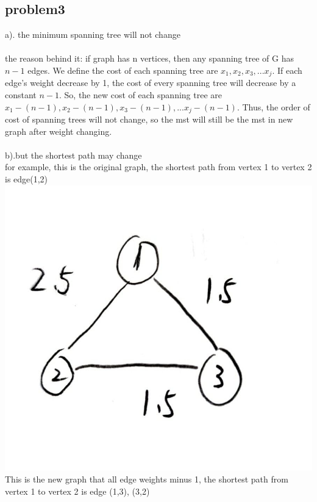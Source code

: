 \documentclass[11pt]{article}
\begin{document}
\subsection{problem3}
a). the minimum spanning tree will not change\\
\\the reason behind it: if graph has n vertices, then any spanning tree of G has $n-1$ edges. We define the cost of each spanning tree are $x_1,x_2,x_3,...x_j$. If each edge's weight decrease by 1, the cost of every spanning tree will decrease  by a constant $n-1$. So, the new cost of each spanning tree are $x_1-(n-1),x_2-(n-1),x_3-(n-1),...x_j-(n-1)$. Thus, the order of cost of spanning trees will not change, so the mst will still be the mst in new graph after weight changing.   \\
\\
b).but the shortest path may change\\
for example, this is the original graph, the shortest path from vertex 1 to vertex 2 is edge(1,2)\\
\includegraphics[scale=0.2]{og1}\\
This is the new graph that all edge weights minus 1, the shortest path from vertex 1 to vertex 2 is edge (1,3), (3,2)\\
\end{document}
